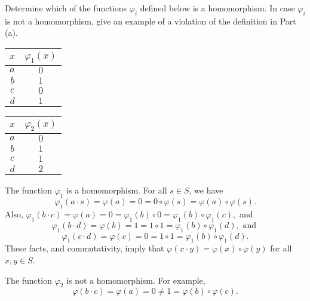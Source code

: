 \documentclass[fleqn,12pt]{article}
\newcommand{\<}{\ensuremath{\langle}}
\renewcommand{\>}{\ensuremath{\rangle}}
\begin{document}
\begin{enumerate}[{\bf 1.}]
\begin{enumerate}
\begin{center}
\end{center}

Determine which of the functions $\varphi_i$ defined below is a homomorphism.
In case $\varphi_i$ is not a homomorphism, give an example of 
a violation of the definition in Part (a).

\medskip
\begin{center}
\begin{tabular}{c|c}
  $x$ & $\varphi_1(x)$ \\
\hline
  $a$ & $0$\\\hline
  $b$ & $1$\\\hline
  $c$ & $0$\\\hline
  $d$ & $1$
\end{tabular}
\hskip3cm
\begin{tabular}{c|c}
  $x$ & $\varphi_2(x)$ \\
\hline
  $a$ & $0$\\\hline
  $b$ & $1$\\\hline
  $c$ & $1$\\\hline
  $d$ & $2$
\end{tabular}
\end{center}

\medskip

The function $\varphi_1$ is a homomorphism. For all $s\in S$, we have 
\[
\varphi_1(a\cdot s) = \varphi(a) = 0 = 0 \circ \varphi(s) = \varphi(a) \circ
\varphi(s).\]
Also, $\varphi_1(b\cdot c) = \varphi(a) = 0 = \varphi_1(b) \circ 0 = \varphi_1(b) \circ \varphi_1(c),$
and
\[\varphi_1(b\cdot d) = \varphi(b) = 1 = 1\circ 1 = \varphi_1(b) \circ
\varphi_1(d), \text{ and }\]
\[\varphi_1(c\cdot d) = \varphi(c) = 0 = 1\circ 1 = \varphi_1(b) \circ
\varphi_1(d).\]
These facts, and commutativity, imply that 
$\varphi(x \cdot y) = \varphi(x) \circ \varphi(y)$ for all $x, y \in S$.  

\medskip

The function $\varphi_2$ is not a homomorphism.  For example, 
\[\varphi(b\cdot c) = \varphi(a) = 0 \neq 1 = \varphi(b) \circ \varphi(c).\]

\end{enumerate}


  \end{enumerate}
\end{document}
